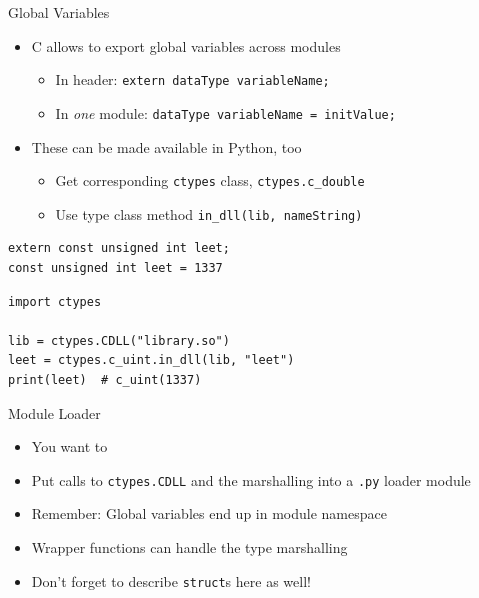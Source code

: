 \begin{frame}[fragile]{Global Variables}
%
\begin{itemize}
\item C allows to export global variables across modules
	\begin{itemize}
	\item In header: \texttt{extern dataType variableName;}
	\item In \emph{one} module: \texttt{dataType variableName = initValue;}
	\end{itemize}
\item These can be made available in Python, too
	\begin{itemize}
	\item Get corresponding \texttt{ctypes} class, \zB \texttt{ctypes.c\_double}
	\item Use type class method \texttt{in\_dll(lib, nameString)}
	\end{itemize}
\end{itemize}
%
\begin{tcbraster}[raster columns=2,
                  raster equal height,
                  nobeforeafter,
                  raster column skip=0.2cm]
\begin{codebox}
\begin{verbatim}
extern const unsigned int leet;
const unsigned int leet = 1337
\end{verbatim}
\end{codebox}
%
\begin{codebox}
\begin{verbatim}
import ctypes

lib = ctypes.CDLL("library.so")
leet = ctypes.c_uint.in_dll(lib, "leet")
print(leet)  # c_uint(1337)
\end{verbatim}
\end{codebox}
\end{tcbraster}
%
\end{frame}


\begin{frame}{Module Loader}
%
\begin{itemize}
\item You want to 
\item[\Thus] Put calls to \texttt{ctypes.CDLL} and the marshalling into a \texttt{.py} loader module
\item Remember: Global variables end up in module namespace
\item Wrapper functions can handle the type marshalling
\item Don't forget to describe \texttt{struct}s here as well!
\end{itemize}
%
\end{frame}

